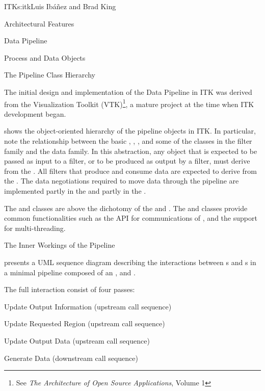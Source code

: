 \begin{aosachapter}{ITK}{s:itk}{Luis Ib\'{a}\~{n}ez and Brad King}
\begin{aosasect1}{Architectural Features}
\begin{aosasect2}{Data Pipeline}
\begin{aosasect3}{Process and Data Objects}
\end{aosasect3}

\begin{aosasect3}{The Pipeline Class Hierarchy}


The initial design and implementation of the Data Pipeline in ITK was derived
from the Visualization Toolkit (VTK)\footnote{See \emph{The Architecture
of Open Source Applications}, Volume 1},  a mature project at the time
when ITK development began.

 shows the object-oriented
hierarchy of the pipeline objects in ITK. In particular, note the relationship
between the basic , , , and
some of the classes in the filter family and the data family. In this
abstraction, any object that is expected to be passed as input to a filter, or
to be produced as output by a filter, must derive from the . All
filters that produce and consume data are expected to derive from the
. The data negotiations required to move data through the
pipeline are implemented partly in the  and partly in the
.

The  and  classes are above the
dichotomy of the  and . The
 and  classes provide common
functionalities such as the API for communications of ,
and the support for multi-threading.

\end{aosasect3}


\begin{aosasect3}{The Inner Workings of the Pipeline}

 presents a UML
sequence diagram describing the interactions between s and
s in a minimal pipeline composed of an ,
 and . 

The full interaction consist of four passes:

\begin{aosaitemize}
\item Update Output Information (upstream call sequence)
\item Update Requested Region (upstream call sequence)
\item Update Output Data (upstream call sequence)
\item Generate Data (downstream call sequence)
\end{aosaitemize}


\end{aosasect3}
\end{aosasect2}
\end{aosasect1}
\end{aosachapter}
